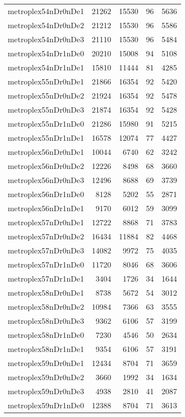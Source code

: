 \begin{tabular}{lrrrr}
metroplex54nDr0nDe1 & 21262 & 15530 & 96 & 5636 \\
metroplex54nDr0nDe2 & 21212 & 15530 & 96 & 5586 \\
metroplex54nDr0nDe3 & 21110 & 15530 & 96 & 5484 \\
metroplex54nDr1nDe0 & 20210 & 15008 & 94 & 5108 \\
metroplex54nDr1nDe1 & 15810 & 11444 & 81 & 4285 \\
metroplex55nDr0nDe1 & 21866 & 16354 & 92 & 5420 \\
metroplex55nDr0nDe2 & 21924 & 16354 & 92 & 5478 \\
metroplex55nDr0nDe3 & 21874 & 16354 & 92 & 5428 \\
metroplex55nDr1nDe0 & 21286 & 15980 & 91 & 5215 \\
metroplex55nDr1nDe1 & 16578 & 12074 & 77 & 4427 \\
metroplex56nDr0nDe1 & 10044 & 6740 & 62 & 3242 \\
metroplex56nDr0nDe2 & 12226 & 8498 & 68 & 3660 \\
metroplex56nDr0nDe3 & 12496 & 8688 & 69 & 3739 \\
metroplex56nDr1nDe0 & 8128 & 5202 & 55 & 2871 \\
metroplex56nDr1nDe1 & 9170 & 6012 & 59 & 3099 \\
metroplex57nDr0nDe1 & 12722 & 8868 & 71 & 3783 \\
metroplex57nDr0nDe2 & 16434 & 11884 & 82 & 4468 \\
metroplex57nDr0nDe3 & 14082 & 9972 & 75 & 4035 \\
metroplex57nDr1nDe0 & 11720 & 8046 & 68 & 3606 \\
metroplex57nDr1nDe1 & 3404 & 1726 & 34 & 1644 \\
metroplex58nDr0nDe1 & 8738 & 5672 & 54 & 3012 \\
metroplex58nDr0nDe2 & 10984 & 7366 & 63 & 3555 \\
metroplex58nDr0nDe3 & 9362 & 6106 & 57 & 3199 \\
metroplex58nDr1nDe0 & 7230 & 4546 & 50 & 2634 \\
metroplex58nDr1nDe1 & 9354 & 6106 & 57 & 3191 \\
metroplex59nDr0nDe1 & 12434 & 8704 & 71 & 3659 \\
metroplex59nDr0nDe2 & 3660 & 1992 & 34 & 1634 \\
metroplex59nDr0nDe3 & 4938 & 2810 & 41 & 2087 \\
metroplex59nDr1nDe0 & 12388 & 8704 & 71 & 3613 \\

\end{tabular}

